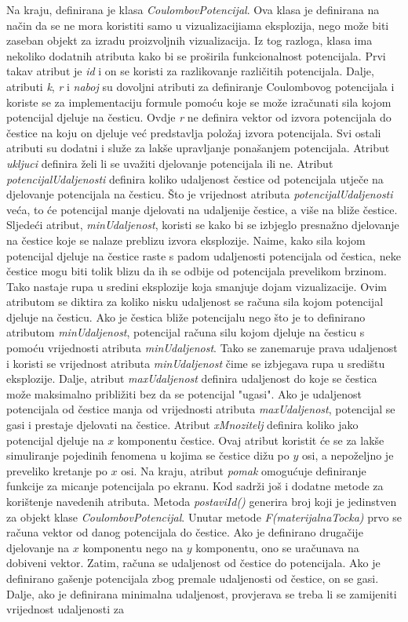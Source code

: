 \documentclass{foi}
\begin{document}
Na kraju, definirana je klasa \textit{CoulombovPotencijal}. Ova klasa je definirana na način da se ne mora koristiti samo u vizualizacijiama eksplozija, nego može biti zaseban objekt za izradu proizvoljnih vizualizacija. Iz tog razloga, klasa ima nekoliko dodatnih atributa kako bi se proširila funkcionalnost potencijala. Prvi takav atribut je \textit{id} i on se koristi za razlikovanje različitih potencijala. Dalje, atributi \textit{k}, \textit{r} i \textit{naboj} su dovoljni atributi za definiranje Coulombovog potencijala i koriste se za implementaciju formule pomoću koje se može izračunati sila kojom potencijal djeluje na česticu. Ovdje \textit{r} ne definira vektor od izvora potencijala do čestice na koju on djeluje već predstavlja položaj izvora potencijala. Svi ostali atributi su dodatni i služe za lakše upravljanje ponašanjem potencijala. Atribut \textit{ukljuci} definira želi li se uvažiti djelovanje potencijala ili ne. Atribut \textit{potencijalUdaljenosti} definira koliko udaljenost čestice od potencijala utječe na djelovanje potencijala na česticu. Što je vrijednost atributa \textit{potencijalUdaljenosti} veća, to će potencijal manje djelovati na udaljenije čestice, a više na bliže čestice. Sljedeći atribut, \textit{minUdaljenost}, koristi se kako bi se izbjeglo presnažno djelovanje na čestice koje se nalaze preblizu izvora eksplozije. Naime, kako sila kojom potencijal djeluje na čestice raste s padom udaljenosti potencijala od čestica, neke čestice mogu biti tolik blizu da ih se odbije od potencijala prevelikom brzinom. Tako nastaje rupa u sredini eksplozije koja smanjuje dojam vizualizacije. Ovim atributom se diktira za koliko nisku udaljenost se računa sila kojom potencijal djeluje na česticu. Ako je čestica bliže potencijalu nego što je to definirano atributom \textit{minUdaljenost}, potencijal računa silu kojom djeluje na česticu s pomoću vrijednosti atributa \textit{minUdaljenost}. Tako se zanemaruje prava udaljenost i koristi se vrijednost atributa \textit{minUdaljenost} čime se izbjegava rupa u središtu eksplozije. Dalje, atribut \textit{maxUdaljenost} definira udaljenost do koje se čestica može maksimalno približiti bez da se potencijal "ugasi". Ako je udaljenost potencijala od čestice manja od vrijednosti atributa \textit{maxUdaljenost}, potencijal se gasi i prestaje djelovati na čestice. Atribut \textit{xMnozitelj} definira koliko jako potencijal djeluje na $x$ komponentu čestice. Ovaj atribut koristit će se za lakše simuliranje pojedinih fenomena u kojima se čestice dižu po $y$ osi, a nepoželjno je preveliko kretanje po $x$ osi. Na kraju, atribut \textit{pomak} omogućuje definiranje funkcije za micanje potencijala po ekranu. Kod sadrži još i dodatne metode za korištenje navedenih atributa. Metoda \textit{postaviId()} generira broj koji je jedinstven za objekt klase \textit{CoulombovPotencijal}. Unutar metode \textit{F(materijalnaTocka)} prvo se računa vektor od danog potencijala do čestice. Ako je definirano drugačije djelovanje na $x$ komponentu nego na $y$ komponentu, ono se uračunava na dobiveni vektor. Zatim, računa se udaljenost od čestice do potencijala. Ako je definirano gašenje potencijala zbog premale udaljenosti od čestice, on se gasi. Dalje, ako je definirana minimalna udaljenost, provjerava se treba li se zamijeniti vrijednost udaljenosti za 
\end{document}
